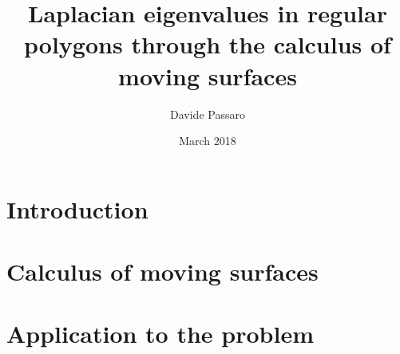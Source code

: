 \documentclass{article}
\title{Laplacian eigenvalues in regular polygons through the calculus of moving surfaces}
\author{Davide Passaro}
\date{March 2018}
\theoremstyle{plain}
\theoremstyle{definition}
\theoremstyle{remark}
\begin{document}
\maketitle

\section{Introduction}
    
\section{Calculus of moving surfaces}
    
\section{Application to the problem}
	 
	 
{}

\end{document}
